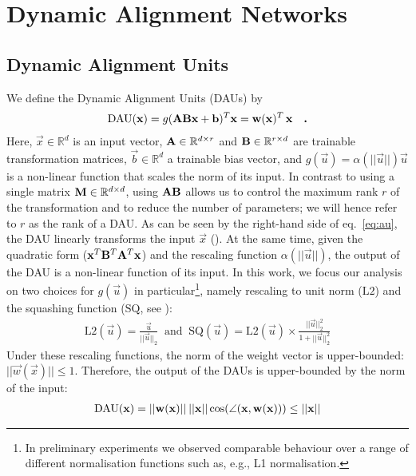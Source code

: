 \section{Dynamic Alignment Networks}
\label{subsec:alignment}



\subsection{Dynamic Alignment Units}
\label{subsec:align_units}
We define the Dynamic Alignment Units (DAUs) by
\begin{align}
    \label{eq:au}
    \text{DAU}(\vec x) = g(\mat a \mat b\vec x +\vec b)^T \vec x = \vec w(\vec x)^T\, \vec x\quad \textbf{.}
\end{align}
% 
Here, $\vec x\in\mathbb R^{d}$ is an input vector, $\mat a\in\mathbb R^{d\times r}$ and $\mat b \in \mathbb R^{r\times d}$ are trainable transformation matrices, $\vec b\in\mathbb R^{d}$ a trainable bias vector, and \mbox{$g(\vec u)=\alpha(||\vec u||)\vec u$} is a non-linear function that scales the norm of its input. {In contrast to using a single matrix $\mat m \in\mathbb R^{d\times d}$, using $\mat{ab}$ allows us to control the maximum rank $r$ of the transformation and to reduce the number of parameters}; we will hence refer to $r$ as the rank of a DAU. 
%
As can be seen by the right-hand side of eq.~\eqref{eq:au}, the DAU linearly transforms the input $\vec x$ (). At the same time, given the quadratic form ($\vec x^T\mat B^T\mat A^T\vec x$) and the  rescaling function $\alpha(||\vec u||)$, the output of the DAU is a non-linear function of its input. In this work, we focus our analysis on 
two choices for $g(\vec u)$ in particular\footnote{
In preliminary experiments we observed comparable behaviour over a range of different normalisation functions such as, e.g., L1 normalisation.}, namely rescaling to unit norm ($\text{L2}$) and the squashing function ($\text{SQ}$, see \cite{sabour2017dynamic}):
\begin{align}
    \label{eq:nonlin}
    \text{L2}(\vec u) = \frac{\vec u}{||\vec u||_2} \;\;\text{and}\;\;
    \text{SQ}(\vec u) = \text{L2}(\vec u) \times \frac{||\vec u||^2_2}{1+||\vec u||_2^2}
\end{align}
Under these rescaling functions, the norm of the weight vector is upper-bounded: $||\vec w(\vec x)|| \leq 1$. Therefore, the output of the DAUs is upper-bounded by the norm of the input:
\begin{align}
    \text{DAU}(\vec x) = 
    ||\vec w(\vec x)|| \hspace{.2em} ||\vec x|| \cos(\angle(\vec x, \vec w(\vec x)))\leq ||\vec x||
    \label{eq:bound}
\end{align}
